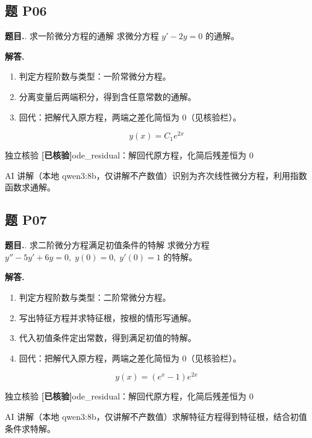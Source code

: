 \documentclass[11pt]{article}
\newcommand{\okmark}{\textcolor{okgreen}{\textbf{[已核验]}}}
\begin{document}
\subsection*{题 P06}
\noindent\textbf{题目.}. 求一阶微分方程的通解
求微分方程 $y' - 2y = 0$ 的通解。\par
\vspace{4pt}\noindent\textbf{解答.}\quad
\begin{enumerate}[leftmargin=1.6em,itemsep=2pt]
  \item 判定方程阶数与类型：一阶常微分方程。
  \item 分离变量后两端积分，得到含任意常数的通解。
  \item 回代：把解代入原方程，两端之差化简恒为 $0$（见核验栏）。
\end{enumerate}
\[ \boxed{y{\left(x \right)} = C_{1} e^{2 x}} \]
\par
\begin{veribox}{独立核验 \okmark}ode\_residual：解回代原方程，化简后残差恒为 0\end{veribox}
\begin{aibox}{AI 讲解（本地 qwen3:8b，仅讲解不产数值）}识别为齐次线性微分方程，利用指数函数求通解。\end{aibox}
\vspace{10pt}
\subsection*{题 P07}
\noindent\textbf{题目.}. 求二阶微分方程满足初值条件的特解
求微分方程 $y'' - 5y' + 6y = 0,\; y(0)=0,\; y'(0)=1$ 的特解。\par
\vspace{4pt}\noindent\textbf{解答.}\quad
\begin{enumerate}[leftmargin=1.6em,itemsep=2pt]
  \item 判定方程阶数与类型：二阶常微分方程。
  \item 写出特征方程并求特征根，按根的情形写通解。
  \item 代入初值条件定出常数，得到满足初值的特解。
  \item 回代：把解代入原方程，两端之差化简恒为 $0$（见核验栏）。
\end{enumerate}
\[ \boxed{y{\left(x \right)} = \left(e^{x} - 1\right) e^{2 x}} \]
\par
\begin{veribox}{独立核验 \okmark}ode\_residual：解回代原方程，化简后残差恒为 0\end{veribox}
\begin{aibox}{AI 讲解（本地 qwen3:8b，仅讲解不产数值）}求解特征方程得到特征根，结合初值条件求特解。\end{aibox}
\vspace{10pt}
\end{document}
